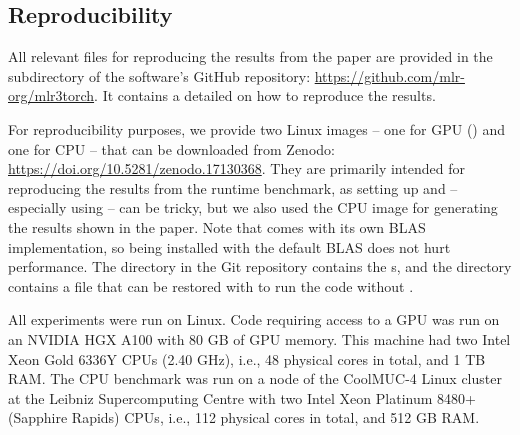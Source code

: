\documentclass[article,shortnames]{jss}
\theoremstyle{definition}
\begin{document}
\begin{appendix}

\newpage
\section{Reproducibility}\label{app:comp-details}

All relevant files for reproducing the results from the paper are provided in the  subdirectory of the software's GitHub repository: \url{https://github.com/mlr-org/mlr3torch}.
It contains a detailed  on how to reproduce the results.

For reproducibility purposes, we provide two Linux  images -- one for GPU () and one for CPU -- that can be downloaded from Zenodo: \url{https://doi.org/10.5281/zenodo.17130368}.
They are primarily intended for reproducing the results from the runtime benchmark, as setting up \pytorch{} and \torch{} -- especially using  -- can be tricky, but we also used the CPU  image for generating the results shown in the paper.
Note that \torch{} comes with its own BLAS implementation, so \rlang{} being installed with the default BLAS does not hurt performance.
The  directory in the Git repository contains the s, and the  directory contains a  file that can be restored with  \citep{ref-renv} to run the code without .

All experiments were run on Linux.
Code requiring access to a GPU was run on an NVIDIA HGX A100 with 80 GB of GPU memory.
This machine had two Intel Xeon Gold 6336Y CPUs (2.40 GHz), i.e., 48 physical cores in total, and 1 TB RAM.
The CPU benchmark was run on a node of the CoolMUC-4 Linux cluster at the Leibniz Supercomputing Centre with two Intel Xeon Platinum 8480+ (Sapphire Rapids) CPUs, i.e., 112 physical cores in total, and 512 GB RAM.


\end{appendix}
\end{document}
